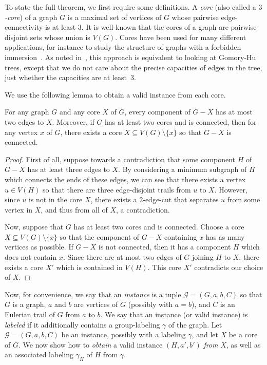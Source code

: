 \documentclass[a4paper, 12pt]{article}
\begin{document}
To state the full theorem, we first require some definitions. A \emph{core} (also called a \emph{$3$-core}) of a graph $G$ is a maximal set of vertices of $G$ whose pairwise edge-connectivity is at least $3$. It is well-known that the cores of a graph are pairwise-disjoint sets whose union is $V(G)$. Cores have been used for many different applications, for instance to study the structure of graphs with a forbidden immersion~\cite{WollanImmersions}. As noted in~\cite{Devos2013note}, this approach is equivalent to looking at Gomory-Hu trees, except that we do not care about the precise capacities of edges in the tree, just whether the capacities are at least~$3$. 

We use the following lemma to obtain a valid instance from each core.

\begin{lemma}
\label{lem:aboutCores}
For any graph $G$ and any core $X$ of $G$, every component of $G-X$ has at most two edges to $X$. Moreover, if $G$ has at least two cores and is connected, then for any vertex $x$ of $G$, there exists a core $X \subseteq V(G)\setminus \{x\}$ so that $G-X$ is connected.
\end{lemma}
\begin{proof}
	First of all, suppose towards a contradiction that some component $H$ of $G-X$ has at least three edges to $X$. By considering a minimum subgraph of $H$ which connects the ends of these edges, we can see that there exists a vertex $u \in V(H)$ so that there are three edge-disjoint trails from $u$ to $X$. However, since $u$ is not in the core $X$, there exists a $2$-edge-cut that separates $u$ from some vertex in $X$, and thus from all of $X$, a contradiction.
	
	Now, suppose that $G$ has at least two cores and is connected. Choose a core $X \subseteq V(G)\setminus \{x\}$ so that the component of $G-X$ containing $x$ has as many vertices as possible. If $G-X$ is not connected, then it has a component $H$ which does not contain $x$. Since there are at most two edges of $G$ joining $H$ to $X$, there exists a core $X'$ which is contained in $V(H)$. This core $X'$ contradicts our choice of $X$.
\end{proof}

Now, for convenience, we say that an \emph{instance} is a tuple $\mathcal{G}=(G, a, b, C)$ so that $G$ is a graph, $a$ and $b$ are vertices of $G$ (possibly with $a=b$), and $C$ is an Eulerian trail of $G$ from $a$ to $b$. We say that an instance (or valid instance)  is \emph{labeled} if it additionally contains a group-labeling $\gamma$ of the graph. Let $\mathcal{G}=(G, a, b, C)$ be an instance, possibly with a labeling $\gamma$, and let $X$ be a core of $G$. We now show how to \emph{obtain} a valid instance $(H, a', b')$ \emph{from} $X$, as well as an associated labeling $\gamma_H$ of $H$ from $\gamma$.
\end{document}
